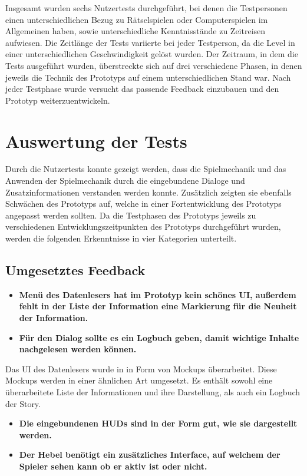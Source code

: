 Insgesamt wurden sechs Nutzertests durchgeführt, bei denen die Testpersonen einen unterschiedlichen Bezug zu Rätselspielen oder Computerspielen im Allgemeinen haben, sowie unterschiedliche Kenntnisstände zu Zeitreisen aufwiesen. Die Zeitlänge der Tests variierte bei jeder Testperson, da die Level in einer unterschiedlichen Geschwindigkeit gelöst wurden.
Der Zeitraum, in dem die Tests ausgeführt wurden, überstreckte sich auf drei verschiedene Phasen, in denen jeweils die Technik des Prototyps auf einem unterschiedlichen Stand war. Nach jeder Testphase wurde versucht das passende Feedback einzubauen und den Prototyp weiterzuentwickeln.

\section{Auswertung der Tests}\label{sec:test-result}
Durch die Nutzertests konnte gezeigt werden, dass die Spielmechanik und das Anwenden der Spielmechanik durch die eingebundene Dialoge und Zusatzinformationen verstanden werden konnte. Zusätzlich zeigten sie ebenfalls Schwächen des Prototyps auf, welche in einer Fortentwicklung des Prototyps angepasst werden sollten. 
Da die Testphasen des Prototyps jeweils zu verschiedenen Entwicklungszeitpunkten des Prototyps durchgeführt wurden, werden die folgenden Erkenntnisse in vier Kategorien unterteilt.

\subsection{Umgesetztes Feedback}

\begin{itemize}  
    \item \textbf{Menü des Datenlesers hat im Prototyp kein schönes \ac{UI}, außerdem fehlt in der Liste der Information eine Markierung für die Neuheit der Information.}
    \item \textbf{Für den Dialog sollte es ein Logbuch geben, damit wichtige Inhalte nachgelesen werden können.}
\end{itemize}

Das \ac{UI} des Datenlesers wurde in  in Form von Mockups überarbeitet. Diese Mockups werden in einer ähnlichen Art umgesetzt. Es enthält sowohl eine überarbeitete Liste der Informationen und ihre Darstellung, als auch ein Logbuch der Story.

\begin{itemize}  
    \item \textbf{Die eingebundenen  \ac{HUD}s sind in der Form gut, wie sie dargestellt werden.}
    \item \textbf{Der Hebel benötigt ein zusätzliches Interface, auf welchem der Spieler sehen kann ob er aktiv ist oder nicht.}
\end{itemize}

